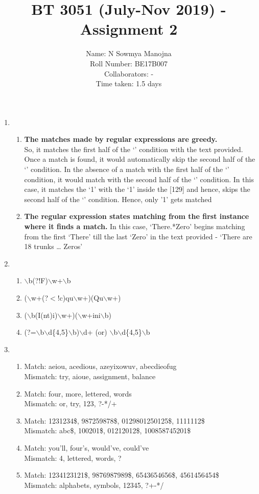 \documentclass[11pt,a4paper]{article}
\title{BT 3051 (July-Nov 2019) - Assignment 2}
\author{Name: N Sowmya Manojna\\Roll Number: BE17B007\\ Collaborators: - \\Time taken: 1.5 days}
\date{}
\begin{document}
\maketitle
\begin{enumerate}
\item{
\begin{enumerate}
\item {\textbf{The matches made by regular expressions are greedy.}\\
So, it matches the first half of the `\textbar' condition with the text provided. Once a match is found, it would automatically skip the second half of the `\textbar' condition. In the absence of a match with the first half of the `\textbar' condition, it would match with the second half of the `\textbar' condition. 
In this case, it matches the `1' with the `1' inside the [129] and hence, skips the second half of the `\textbar' condition. Hence, only '1' gets matched}
\item{\textbf{The regular expression states matching from the first instance where it finds a match.} In this case, `There.*Zero' begins matching from the first `There' till the last `Zero' in the text provided  - `There are 18 trunks … Zeros'}\end{enumerate}}

\vspace{0.5em}

\item{
\begin{enumerate}
\item {$\backslash$b(?!F)$\backslash$w+$\backslash$b}
\item {($\backslash$w+(?$<$!c)qu$\backslash$w+)\textbar(Qu$\backslash$w+)}
\item {($\backslash$b(I(n\textbar t)i)$\backslash$w+)\textbar($\backslash$w+ini$\backslash$b)}
\item {(?=$\backslash$b$\backslash$d\{4,5\}$\backslash$b)$\backslash$d+ (or) $\backslash$b$\backslash$d\{4,5\}$\backslash$b}
\end{enumerate}}

\vspace{0.5em}

\item{
\begin{enumerate}
\item {Match: aeiou, acedious, azeyixowuv, abecdieofug \\
Mismatch: try, aioue, assignment, balance
}
\item {Match: four, more, lettered, words \\
Mismatch: or, try, 123, ?-*/+
}
\item {Match: 1231234\$, 987259878\$, 0129801250125\$, 1111112\$ \\
Mismatch: abc\$, 100201\$, 01212012\$, 100858745201\$
}
\item {Match: you'll, four's, would've, could've\\
Mismatch: 4, lettered, words, ?
}
\item {Match: 1234123121\$, 9876987989\$, 6543654656\$, 4561456454\$ \\
Mismatch: alphabets, symbols, 12345, ?+-*/
}
\end{enumerate}}


\end{enumerate}
\end{document}

